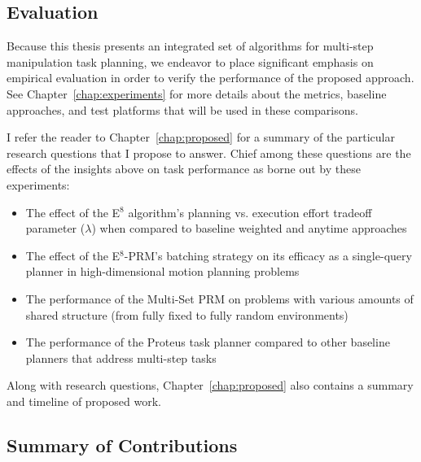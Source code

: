 \subsection*{Evaluation}

Because this thesis presents an integrated set of algorithms
for multi-step manipulation task planning,
we endeavor to place significant emphasis on empirical evaluation
in order to verify the performance of the proposed approach.
See Chapter~\ref{chap:experiments} for more details
about the metrics, baseline approaches, and test platforms
that will be used in these comparisons.

I refer the reader to Chapter~\ref{chap:proposed} for a summary
of the particular research questions that I propose to answer.
Chief among these questions are the effects of the insights above
on task performance as borne out by these experiments:
\begin{itemize}
\item The effect of the E$^8$ algorithm's planning vs. execution
   effort tradeoff parameter ($\lambda$)
   when compared to baseline weighted and anytime approaches
\item The effect of the E$^8$-PRM's batching strategy on its efficacy
   as a single-query planner in high-dimensional motion planning
   problems
\item The performance of the Multi-Set PRM on problems with various
   amounts of shared structure
   (from fully fixed to fully random environments)
\item The performance of the Proteus task planner
   compared to other baseline planners that address multi-step tasks
\end{itemize}
Along with research questions,
Chapter~\ref{chap:proposed} also contains
a summary and timeline of proposed work.

\subsection*{Summary of Contributions}

